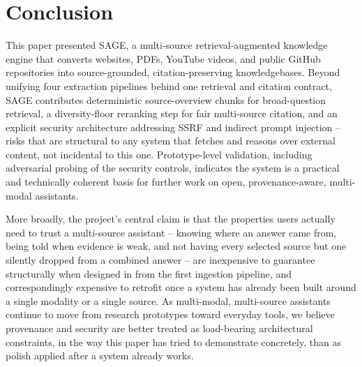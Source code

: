 \documentclass[conference]{IEEEtran}
\begin{document}
\section{Conclusion}

This paper presented SAGE, a multi-source retrieval-augmented knowledge
engine that converts websites, PDFs, YouTube videos, and public GitHub
repositories into source-grounded, citation-preserving knowledgebases.
Beyond unifying four extraction pipelines behind one retrieval and
citation contract, SAGE contributes deterministic source-overview
chunks for broad-question retrieval, a diversity-floor reranking step
for fair multi-source citation, and an explicit security architecture
addressing SSRF and indirect prompt injection -- risks that are
structural to any system that fetches and reasons over external content,
not incidental to this one. Prototype-level validation, including
adversarial probing of the security controls, indicates the system is a
practical and technically coherent basis for further work on open,
provenance-aware, multi-modal assistants.

More broadly, the project's central claim is that the properties users
actually need to trust a multi-source assistant -- knowing where an
answer came from, being told when evidence is weak, and not having every
selected source but one silently dropped from a combined answer -- are
inexpensive to guarantee structurally when designed in from the first
ingestion pipeline, and correspondingly expensive to retrofit once a
system has already been built around a single modality or a single
source. As multi-modal, multi-source assistants continue to move from
research prototypes toward everyday tools, we believe provenance and
security are better treated as load-bearing architectural constraints,
in the way this paper has tried to demonstrate concretely, than as
polish applied after a system already works.
\end{document}
